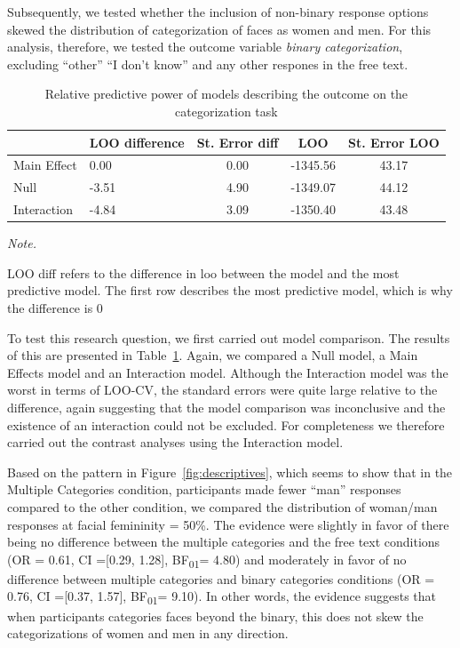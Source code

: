 \documentclass[
  man]{apa7}
\begin{document}
Subsequently, we tested whether the inclusion of non-binary response options skewed the distribution of categorization of faces as women and men. For this analysis, therefore, we tested the outcome variable \emph{binary categorization}, excluding ``other'' ``I don't know'' and any other respones in the free text.

\begin{table}

\caption{\label{tab:rq2-table}Relative predictive power of models describing the outcome on the categorization task}
\centering
\begin{threeparttable}
\begin{tabular}[t]{llccc}
\toprule
  & LOO difference & St. Error diff & LOO & St. Error LOO\\
\midrule
Main Effect & 0.00 & 0.00 & -1345.56 & 43.17\\
Null & -3.51 & 4.90 & -1349.07 & 44.12\\
Interaction & -4.84 & 3.09 & -1350.40 & 43.48\\
\bottomrule
\end{tabular}
\begin{tablenotes}[para]
\item \textit{Note.} 
\item LOO diff refers to the difference in loo between the model and the most predictive model. The first row describes the most predictive model, which is why the difference is 0
\end{tablenotes}
\end{threeparttable}
\end{table}

To test this research question, we first carried out model comparison. The results of this are presented in Table~\ref{tab:rq2-table}. Again, we compared a Null model, a Main Effects model and an Interaction model. Although the Interaction model was the worst in terms of LOO-CV, the standard errors were quite large relative to the difference, again suggesting that the model comparison was inconclusive and the existence of an interaction could not be excluded. For completeness we therefore carried out the contrast analyses using the Interaction model.

Based on the pattern in Figure~\ref{fig:descriptives}, which seems to show that in the Multiple Categories condition, participants made fewer ``man'' responses compared to the other condition, we compared the distribution of woman/man responses at facial femininity = 50\%. The evidence were slightly in favor of there being no difference between the multiple categories and the free text conditions (OR = 0.61, CI ={[}0.29, 1.28{]}, BF\textsubscript{01}= 4.80) and moderately in favor of no difference between multiple categories and binary categories conditions (OR = 0.76, CI ={[}0.37, 1.57{]}, BF\textsubscript{01}= 9.10). In other words, the evidence suggests that when participants categories faces beyond the binary, this does not skew the categorizations of women and men in any direction.
\end{document}
